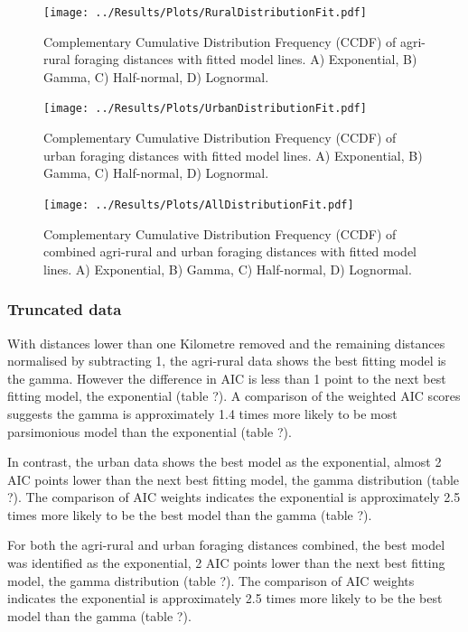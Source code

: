 \documentclass[11pt,usenames,dvipsnames]{article}
\begin{document}
\begin{figure}[H]
	\centering
	\texttt{[image: ../Results/Plots/RuralDistributionFit.pdf]}
	\caption{Complementary Cumulative Distribution Frequency (CCDF) of agri-rural foraging distances with fitted model lines. A) Exponential, B) Gamma, C) Half-normal, D) Lognormal.}
\end{figure}

\begin{figure}[H]
	\centering
	\texttt{[image: ../Results/Plots/UrbanDistributionFit.pdf]}
	\caption{Complementary Cumulative Distribution Frequency (CCDF) of urban foraging distances with fitted model lines. A) Exponential, B) Gamma, C) Half-normal, D) Lognormal.}
\end{figure}

\begin{figure}[H]
	\centering
	\texttt{[image: ../Results/Plots/AllDistributionFit.pdf]}
	\caption{Complementary Cumulative Distribution Frequency (CCDF) of combined agri-rural and urban foraging distances with fitted model lines. A) Exponential, B) Gamma, C) Half-normal, D) Lognormal.}
\end{figure}

\subsubsection{Truncated data}

\hspace{\parindent}
With distances lower than one Kilometre removed and the remaining distances normalised by subtracting 1, the agri-rural data shows the best fitting model is the gamma. However the difference in AIC is less than 1 point to the next best fitting model, the exponential (table ?). A comparison of the weighted AIC scores suggests the gamma is approximately 1.4 times more likely to be most parsimonious model than the exponential (table ?).

In contrast, the urban data shows the best model as the exponential, almost 2 AIC points lower than the next best fitting model, the gamma distribution (table ?). The comparison of AIC weights indicates the exponential is approximately 2.5 times more likely to be the best model than the gamma (table ?).

For both the agri-rural and urban foraging distances combined, the best model was identified as the exponential, 2 AIC points lower than the next best fitting model, the gamma distribution (table ?). The comparison of AIC weights indicates the exponential is approximately 2.5 times more likely to be the best model than the gamma (table ?). 
\end{document}
